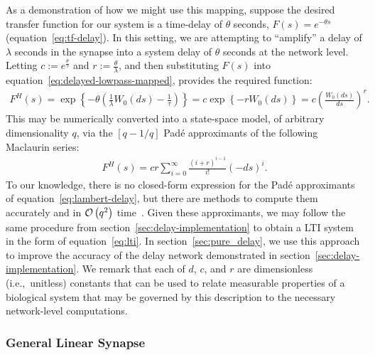 As a demonstration of how we might use this mapping, suppose the desired transfer function for our system is a time-delay of $\theta$ seconds, $F(s) = e^{-\theta s}$ (equation~\ref{eq:tf-delay}).
In this setting, we are attempting to ``amplify'' a delay of $\lambda$ seconds in the synapse into a system delay of $\theta$ seconds at the network level.
Letting $c := e^{\frac{\theta}{\tau}}$ and $r := \frac{\theta}{\lambda}$, and then substituting $F(s)$ into equation~\ref{eq:delayed-lowpass-mapped}, provides the required function:
\begin{align}
F^H(s) = \exp \left\{ -\theta \left( \frac{1}{\lambda} W_0(ds) - \frac{1}{\tau} \right) \right\} = c \exp \left\{-r W_0(ds) \right\} = c \left( \frac{W_0(ds)}{ds} \right)^r \text{.} \nonumber
\end{align}
This may be numerically converted into a state-space model, of arbitrary dimensionality $q$, via the $\left[q-1/q\right]$ Pad\'e approximants of the following Maclaurin series:
\begin{align} \label{eq:lambert-delay}
F^H(s) = c r \sum_{i=0}^\infty \frac{(i+r)^{i-1}}{i!} (-ds)^i \text{.}
\end{align}
To our knowledge, there is no closed-form expression for the Pad\'e approximants of equation~\ref{eq:lambert-delay}, but there are methods to compute them accurately and in $\mathcal{O}\left({q^2}\right)$ time~\citep{sidi2003practical}.
Given these approximants, we may follow the same procedure from section~\ref{sec:delay-implementation} to obtain a LTI system in the form of equation~\ref{eq:lti}.
In section~\ref{sec:pure_delay}, we use this approach to improve the accuracy of the delay network demonstrated in section~\ref{sec:delay-implementation}. %
We remark that each of $d$, $c$, and $r$ are dimensionless (i.e.,~unitless) constants that can be used to relate measurable properties of a biological system that may be governed by this description to the necessary network-level computations.

\subsubsection{General Linear Synapse}

